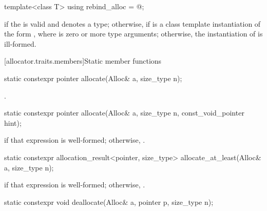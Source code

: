 %
\begin{itemdecl}
template<class T> using rebind_alloc = @\seebelow@;
\end{itemdecl}

\begin{itemdescr}
\pnum
\templalias {} if
the   is valid and denotes a
type; otherwise,
 if  is a class template instantiation
of the form , where  is zero or more type arguments;
otherwise, the instantiation of  is ill-formed.
\end{itemdescr}

[allocator.traits.members]{Static member functions}

%
\begin{itemdecl}
static constexpr pointer allocate(Alloc& a, size_type n);
\end{itemdecl}

\begin{itemdescr}
\pnum
\returns
{}.
\end{itemdescr}

%
\begin{itemdecl}
static constexpr pointer allocate(Alloc& a, size_type n, const_void_pointer hint);
\end{itemdecl}

\begin{itemdescr}
\pnum
\returns
{} if that expression is well-formed; otherwise, .
\end{itemdescr}

%
\begin{itemdecl}
static constexpr allocation_result<pointer, size_type> allocate_at_least(Alloc& a, size_type n);
\end{itemdecl}

\begin{itemdescr}
\pnum
\returns
{} if that expression is well-formed;
otherwise, .
\end{itemdescr}

%
\begin{itemdecl}
static constexpr void deallocate(Alloc& a, pointer p, size_type n);
\end{itemdecl}

